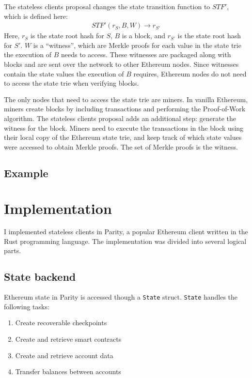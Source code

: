 \documentclass[12pt]{article}
\begin{document}
The stateless clients proposal changes the state transition function to $STF'$, which is defined here:
\begin{align*}
  STF'(r_S, B, W) \to r_{S'}
\end{align*}
Here, $r_S$ is the state root hash for $S$, $B$ is a block, and $r_{S'}$ is the state root hash for $S'$. $W$ is a ``witness'', which are Merkle proofs for each value in the state trie the execution of $B$ needs to access. These witnesses are packaged along with blocks and are sent over the network to other Ethereum nodes. Since witnesses contain the state values the execution of $B$ requires, Ethereum nodes do not need to access the state trie when verifying blocks.

The only nodes that need to access the state trie are miners. In vanilla Ethereum, miners create blocks by including transactions and performing the Proof-of-Work algorithm. The stateless clients proposal adds an additional step: generate the witness for the block. Miners need to execute the transactions in the block using their local copy of the Ethereum state trie, and keep track of which state values were accessed to obtain Merkle proofs. The set of Merkle proofs is the witness.

\subsection{Example}



\section{Implementation}

I implemented stateless clients in Parity, a popular Ethereum client written in the Rust programming language. The implementation was divided into several logical parts.

\subsection{State backend}


Ethereum state in Parity is accessed though a \texttt{State} struct. \texttt{State} handles the following tasks:
\begin{enumerate}
  \item Create recoverable checkpoints
  \item Create and retrieve smart contracts
  \item Create and retrieve account data
  \item Transfer balances between accounts
\end{enumerate}
\end{document}
